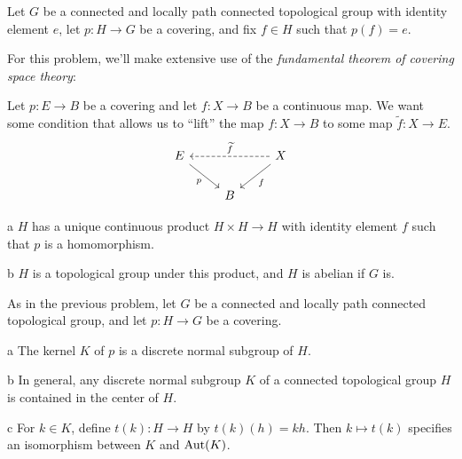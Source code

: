 
\begin{problem}{3.1}
  Let $G$ be a connected and locally path connected topological group with identity element $e$, let $p : H \to G$ be a covering, and fix $f\in H$ such that $p(f)=e$.
\end{problem}

\begin{solution}
  For this problem, we'll make extensive use of the \emph{fundamental theorem of covering space theory}:
  \begin{theorem}
    Let $p : E \to B$ be a covering and let $f : X \to B$ be a continuous map. We want some condition that allows us to ``lift'' the map $f : X \to B$ to some map $\widetilde{f} : X \to E$.
  \[\begin{tikzcd}
	  E && X \\
	  & B
	  \arrow["p"', from=1-1, to=2-2]
	  \arrow["f", from=1-3, to=2-2]
	  \arrow["\widetilde{f}"', dashed, from=1-3, to=1-1]
  \end{tikzcd}\]
  \end{theorem}

  \begin{part}{a}
    $H$ has a unique continuous product $H\times H \to H$ with identity element $f$ such that $p$ is a homomorphism.
  \end{part}

  \begin{part}{b}
    $H$ is a topological group under this product, and $H$ is abelian if $G$ is.
  \end{part}
\end{solution}

\begin{problem}{3.2}
  As in the previous problem, let $G$ be a connected and locally path connected topological group, and let $p : H\to G$ be a covering.
\end{problem}

\begin{parts}
  \begin{part}{a}
    The kernel $K$ of $p$ is a discrete normal subgroup of $H$.
  \end{part}

  \begin{part}{b}
    In general, any discrete normal subgroup $K$ of a connected topological group $H$ is contained in the center of $H$.
  \end{part}

  \begin{part}{c}
    For $k\in K$, define $t(k) : H \to H$ by $t(k)(h) = kh$. Then $k\mapsto t(k)$ specifies an isomorphism between $K$ and $\textrm{Aut}(K)$.
  \end{part}
\end{parts}

